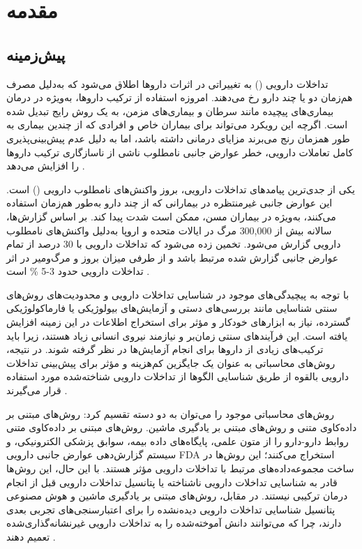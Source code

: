 \chapter{مقدمه}

\section{پیش‌زمینه}

تداخلات دارویی () به تغییراتی در اثرات داروها اطلاق می‌شود که به‌دلیل مصرف هم‌زمان دو یا چند دارو رخ می‌دهند. امروزه استفاده از ترکیب داروها، به‌ویژه در درمان بیماری‌های پیچیده مانند سرطان و بیماری‌های مزمن، به یک روش رایج تبدیل شده است. اگرچه این رویکرد می‌تواند برای بیماران خاص و افرادی که از چندین بیماری به طور همزمان رنج می‌برند مزایای درمانی داشته باشد، اما به دلیل عدم پیش‌بینی‌پذیری کامل تعاملات دارویی، خطر عوارض جانبی نامطلوب ناشی از ناسازگاری ترکیب داروها را افزایش می‌دهد \cite{ref_li2023}.

یکی از جدی‌ترین پیامدهای تداخلات دارویی، بروز واکنش‌های نامطلوب دارویی () است. این عوارض جانبی غیرمنتظره در بیمارانی که از چند دارو به‌طور هم‌زمان استفاده می‌کنند، به‌ویژه در بیماران مسن، ممکن است شدت پیدا کند. بر اساس گزارش‌ها، سالانه بیش از 300,000 مرگ در ایالات متحده و اروپا به‌دلیل واکنش‌های نامطلوب دارویی گزارش می‌شود. تخمین زده می‌شود که تداخلات دارویی با 30 درصد از تمام عوارض جانبی گزارش شده مرتبط باشد \cite{ref_nyamabo2021} و از طرفی میزان بروز و مرگ‌و‌میر در اثر تداخلات دارویی حدود 3-5 \% است \cite{ref_he2023}.

با توجه به پیچیدگی‌های موجود در شناسایی تداخلات دارویی و محدودیت‌های روش‌های سنتی شناسایی مانند بررسی‌های دستی و آزمایش‌های بیولوژیکی یا فارماکولوژیکی گسترده، نیاز به ابزارهای خودکار و مؤثر برای استخراج اطلاعات در این زمینه افزایش یافته است. این فرآیندهای سنتی زمان‌بر و نیازمند نیروی انسانی زیاد هستند، زیرا باید ترکیب‌های زیادی از داروها برای انجام آزمایش‌ها در نظر گرفته شوند. در نتیجه، روش‌های محاسباتی به عنوان یک جایگزین کم‌هزینه و مؤثر برای پیش‌بینی تداخلات دارویی بالقوه از طریق شناسایی الگوها از تداخلات دارویی شناخته‌شده مورد استفاده قرار می‌گیرند \cite{ref_yang2022}.

روش‌های محاسباتی موجود را می‌توان به دو دسته تقسیم کرد: روش‌های مبتنی بر داده‌کاوی متنی و روش‌های مبتنی بر یادگیری ماشین. روش‌های مبتنی بر داده‌کاوی متنی روابط دارو-دارو را از متون علمی، پایگاه‌های داده بیمه، سوابق پزشکی الکترونیکی، و سیستم گزارش‌دهی عوارض جانبی دارویی FDA استخراج می‌کنند؛ این روش‌ها در ساخت مجموعه‌داده‌های مرتبط با تداخلات دارویی مؤثر هستند. با این حال، این روش‌ها قادر به شناسایی تداخلات دارویی ناشناخته یا پتانسیل تداخلات دارویی قبل از انجام درمان ترکیبی نیستند. در مقابل، روش‌های مبتنی بر یادگیری ماشین و هوش مصنوعی پتانسیل شناسایی تداخلات دارویی دیده‌نشده را برای اعتبارسنجی‌های تجربی بعدی دارند، چرا که می‌توانند دانش آموخته‌شده را به تداخلات دارویی غیرنشانه‌گذاری‌شده تعمیم دهند \cite{ref_yang2022, ref_wang2024}.

